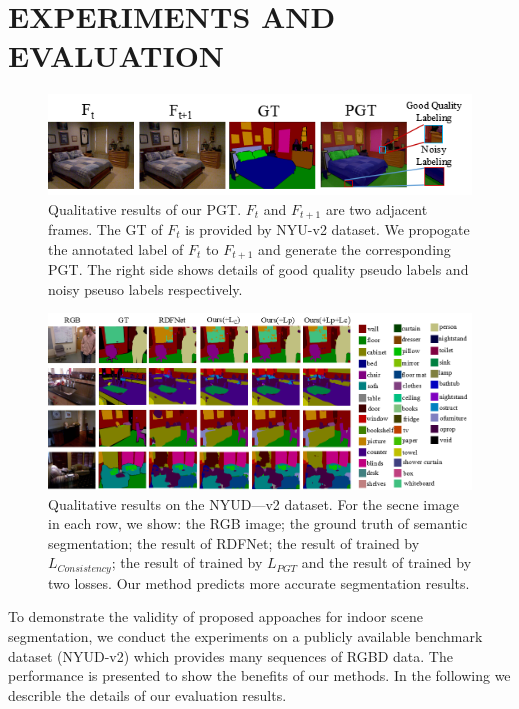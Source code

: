 \section{EXPERIMENTS AND EVALUATION}
\label{sec:exper}

\begin{figure}[tpb]
	\centering
	\includegraphics[scale=0.61]{figure/PGT.png}
	\caption{Qualitative results of our PGT. $F_t$ and $F_{t+1}$ are two adjacent frames. The GT of $F_t$ is provided by NYU-v2 dataset. We propogate the annotated label of $F_{t}$ to $F_{t+1}$ and generate the corresponding PGT. The right side shows details of good quality pseudo labels and noisy pseuso labels respectively.}
	\label{fig:PGT}
\end{figure}

\begin{figure}[!th]
	\centering
	\includegraphics[scale=0.65]{figure/Result.png}
	\caption{Qualitative results on the NYUD—v2 dataset. For the secne image in each row, we show: the RGB image; the ground truth of semantic segmentation; the result of RDFNet; the result of trained by $L_{Consistency}$; the result of trained by $L_{PGT}$ and the result of trained by two losses. Our method predicts more accurate segmentation results.}
	\label{fig:VisResult}
\end{figure}
To demonstrate the validity of proposed appoaches for indoor scene segmentation, we conduct the experiments on a publicly available benchmark dataset (NYUD-v2) which provides many sequences of RGBD data. 
%
The performance is presented to show the benefits of our methods.
%
In the following we describle the details of our evaluation results.


